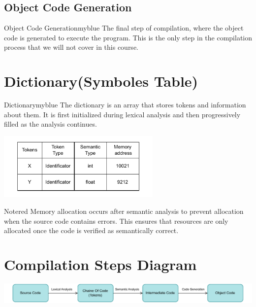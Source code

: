 \vspace{0.35cm}
\subsection{Object Code Generation}

\begin{prettyBox}{Object Code Generation}{myblue}
The final step of compilation, where the object code is generated to execute the program.
This is the only step in the compilation process that we will not cover in this course.
\end{prettyBox}

\vspace{1cm}

\section{Dictionary(Symboles Table)}

\begin{prettyBox}{Dictionary}{myblue}
The dictionary is an array that stores tokens and information about them.
It is first initialized during lexical analysis and then progressively filled
as the analysis continues.
\end{prettyBox}
\vspace{0.35cm}

\begin{center}
    \includegraphics[width=0.6\textwidth]{Chapters/Examples/Intro/dict.drawio.pdf}
\end{center}


\vspace{0.5cm}


\begin{prettyBox}{Note}{red}
Memory allocation occurs after semantic analysis to prevent allocation when
the source code contains errors. This ensures that resources are only allocated
once the code is verified as semantically correct.
\end{prettyBox}

\vspace{0.5cm}

\section{Compilation Steps Diagram}

\vspace{0.3cm}
\begin{center}
    \includegraphics[height=0.08\textheight]{Chapters/Examples/Intro/sum.drawio.pdf}
\end{center}




